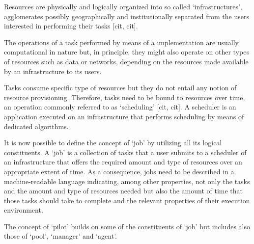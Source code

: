 \documentclass{sig-alternate}
\begin{document}

Resources are physically and logically organized into so called `infrastructures', agglomerates possibly geographically and institutionally separated from the users interested in performing their tasks [cit, cit].


The operations of a task performed by means of a \pilotjob implementation are usually computational in nature but, in principle, they might also operate on other types of resources such as data  or networks, depending on the resources made available by an infrastructure to its users.


Tasks consume specific type of resources but they do not entail any
notion of resource provisioning. Therefore, tasks need to be bound to
resources over time, an operation commonly referred to as `scheduling'
[cit, cit]. A scheduler is an application executed on an infrastructure
that performs scheduling by means of dedicated algorithms.


It is now possible to define the concept of `job' by utilizing all its logical constituents. A `job' is a collection of tasks that a user submits to a scheduler of an infrastructure that offers the required amount and type of resources over an appropriate extent of time. 
As a consequence, jobs need to be described in a machine-readable language indicating, among other properties, not only the tasks and the amount and type of resources needed but also the amount of time that those tasks should take to complete and the relevant properties of their execution environment.


The concept of `pilot' builds on some of the constituents of `job'
but includes also those of `pool', `manager' and `agent'. 

\end{document}

